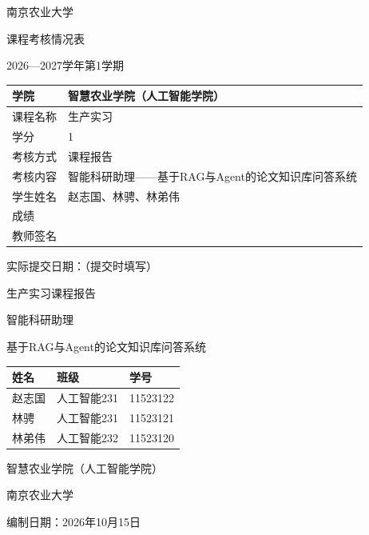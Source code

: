 \documentclass[UTF8,a4paper,zihao=-4,fontset=fandol]{ctexart}
\begin{document}
\hypersetup{pageanchor=false}
\begin{titlepage}\thispagestyle{empty}\centering
 {\heiti{}南京农业大学}\par\vspace{1.1cm}
 {\heiti{}课程考核情况表}\par\vspace{1.1cm}
 {2026—2027学年第1学期}\par\vspace{.9cm}
 \renewcommand{\arraystretch}{1.9}
 \begin{tabularx}{\linewidth}{|p{3cm}|X|}\hline
 学院 & 智慧农业学院（人工智能学院）\\\hline
 课程名称 & 生产实习\\\hline
 学分 & 1\\\hline
 考核方式 & 课程报告\\\hline
 考核内容 & 智能科研助理——基于RAG与Agent的论文知识库问答系统\\\hline
 学生姓名 & 赵志国、林骋、林弟伟\\\hline
 成绩 & \rule{0pt}{1.1cm}\\\hline
 教师签名 & \rule{0pt}{1.1cm}\\\hline
 \end{tabularx}
 \vfill\raggedright{\small 实际提交日期：\underline{\hspace{4cm}}\quad（提交时填写）}
\end{titlepage}
\begin{titlepage}\thispagestyle{empty}\centering
 {\heiti{}生产实习课程报告}\par\vspace{2cm}
 {\heiti{}智能科研助理}\par\vspace{.5cm}
 {\heiti{}基于RAG与Agent的论文知识库问答系统}\par\vspace{2cm}
 \renewcommand{\arraystretch}{1.6}
 \begin{tabular}{lll}\toprule\rowcolor{TableHead}
\textbf{姓名} & \textbf{班级} & \textbf{学号} \\ \midrule
 赵志国 & 人工智能231 & 11523122\\
 林骋 & 人工智能231 & 11523121\\
 林弟伟 & 人工智能232 & 11523120\\\bottomrule\end{tabular}
 \vfill
 智慧农业学院（人工智能学院）\par
 南京农业大学\par\vspace{.4cm}
 编制日期：2026年10月15日
\end{titlepage}
\end{document}
